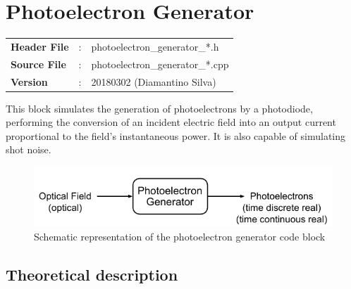 \clearpage

\section{Photoelectron Generator}

\begin{refsection}

\begin{tcolorbox}	
\begin{tabular}{p{2.75cm} p{0.2cm} p{10.5cm}} 	
\textbf{Header File}   &:& photoelectron\_generator\_*.h \\
\textbf{Source File}   &:& photoelectron\_generator\_*.cpp \\
\textbf{Version}       &:& 20180302 (Diamantino Silva)
\end{tabular}
\end{tcolorbox}

\vspace{1em}

This block simulates the generation of photoelectrons by a photodiode, performing the conversion of an incident electric field into an output current proportional to the field's instantaneous power.
It is also capable of simulating shot noise.
%
\begin{figure}[h]
	\centering
	\includegraphics{./lib/photoelectron_generator/figures/photoelectron_generator_scheme.pdf}
	\caption{Schematic representation of the photoelectron generator code block}
\end{figure}

\subsection*{Theoretical description}


\end{refsection}
